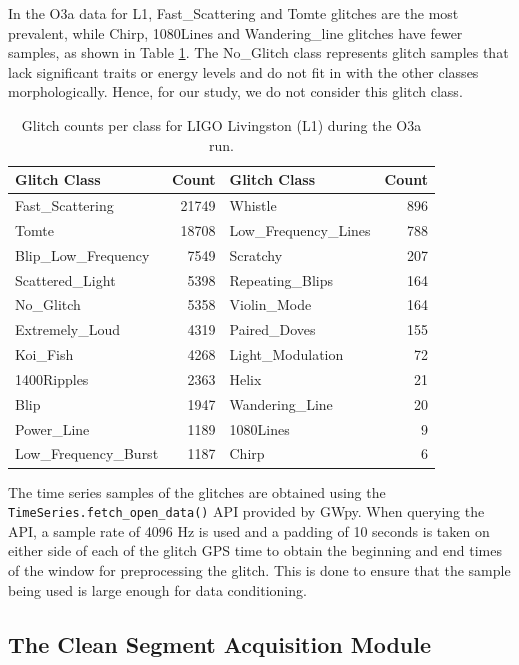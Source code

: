 \documentclass[12pt]{article}
\begin{document}
\medskip
\noindent In the O3a data for L1, Fast\_Scattering and Tomte glitches are the most prevalent, while Chirp, 1080Lines and Wandering\_line glitches have fewer samples, as shown in Table \ref{tab:glitch_classes}. The No\_Glitch class represents glitch samples that lack significant traits or energy levels and do not fit in with the other classes morphologically. Hence, for our study, we do not consider this glitch class.

\begin{table}[H]
    \centering
    \begin{tabular}{lr|lr}
    \toprule
    Glitch Class & Count & Glitch Class & Count \\
    \midrule
    Fast\_Scattering & 21749 & Whistle & 896 \\
    Tomte & 18708 & Low\_Frequency\_Lines & 788\\
    Blip\_Low\_Frequency & 7549 & Scratchy & 207 \\
    Scattered\_Light & 5398 & Repeating\_Blips & 164 \\
    No\_Glitch & 5358 & Violin\_Mode & 164 \\
    Extremely\_Loud & 4319 & Paired\_Doves & 155 \\
    Koi\_Fish & 4268 & Light\_Modulation & 72 \\
    1400Ripples & 2363 & Helix & 21 \\
    Blip & 1947 & Wandering\_Line & 20 \\
    Power\_Line & 1189 & 1080Lines & 9 \\
    Low\_Frequency\_Burst & 1187 & Chirp & 6 \\
    \bottomrule
    \end{tabular}
    \caption{Glitch counts per class for LIGO Livingston (L1) during the O3a run.}
    \label{tab:glitch_classes}
\end{table}

\medskip
\noindent The time series samples of the glitches are obtained using the \texttt{TimeSeries.fetch\_open\_data()} API provided by GWpy. When querying the API, a sample rate of 4096 Hz is used and a padding of 10 seconds is taken on either side of each of the glitch GPS time to obtain the beginning and end times of the window for preprocessing the glitch. This is done to ensure that the sample being used is large enough for data conditioning.

\subsection{The Clean Segment Acquisition Module}\label{Cleandata}
\end{document}

